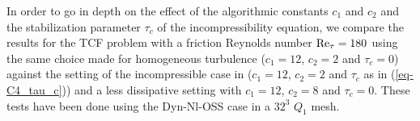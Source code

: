 In order to go in depth on the effect of the algorithmic constants $c_1$ and $c_2$ and the stabilization parameter $\tau_c$ of the incompressibility equation, we compare the results for the TCF problem with a friction Reynolds number ${\rm Re}_\tau=180$ using the same choice made for homogeneous turbulence 
($c_1=12$, $c_2=2$ and $\tau_c=0$) against the setting of the incompressible case in \cite{avila_large_2014} ($c_1=12$, $c_2=2$ and $\tau_c$ as in (\ref{eq-C4_tau_c})) and a less dissipative setting with $c_1=12$, $c_2=8$ and $\tau_c=0$. These tests have been done using the Dyn-Nl-OSS case in a $32^3$ $Q_1$ mesh.
\begin{figure}[h!]
	\centering	
  	\\    

\end{figure}
